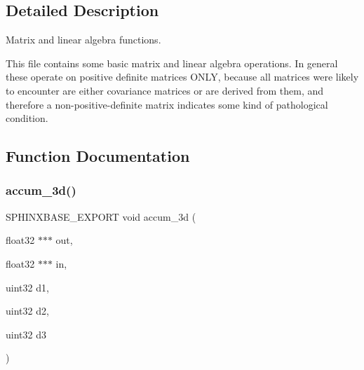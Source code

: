

\subsection{Detailed Description}
Matrix and linear algebra functions. 

This file contains some basic matrix and linear algebra operations. In general these operate on positive definite matrices O\+N\+LY, because all matrices we\textquotesingle{}re likely to encounter are either covariance matrices or are derived from them, and therefore a non-\/positive-\/definite matrix indicates some kind of pathological condition. 

\subsection{Function Documentation}
\mbox{\label{matrix_8h_abf02a99f3dac599148c0e1ee5640b568}} 
\subsubsection{accum\+\_\+3d()}
{\footnotesize\ttfamily S\+P\+H\+I\+N\+X\+B\+A\+S\+E\+\_\+\+E\+X\+P\+O\+RT void accum\+\_\+3d (\begin{DoxyParamCaption}\item[{float32 $\ast$$\ast$$\ast$}]{out,  }\item[{float32 $\ast$$\ast$$\ast$}]{in,  }\item[{uint32}]{d1,  }\item[{uint32}]{d2,  }\item[{uint32}]{d3 }\end{DoxyParamCaption})}



